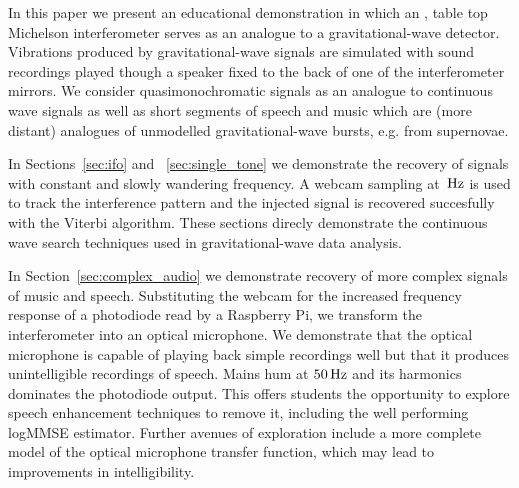 \documentclass[paper-main.tex]{subfiles}
\begin{document}

In this paper we present an educational demonstration in which an , table top Michelson interferometer serves as an analogue to a gravitational-wave detector. 
Vibrations produced by gravitational-wave signals are simulated with sound recordings played though a speaker fixed to the back of one of the interferometer mirrors. 
We consider quasimonochromatic signals as an analogue to continuous wave signals as well as short segments of speech and music which are (more distant) analogues of unmodelled gravitational-wave bursts, e.g. from supernovae. 


In Sections~\ref{sec:ifo} and ~\ref{sec:single_tone} we demonstrate the recovery of signals with constant and slowly wandering frequency. 
A webcam sampling at $\,{\rm Hz}$ is used to track the interference pattern and the injected signal is recovered succesfully with the Viterbi algorithm. 
These sections direcly demonstrate the continuous wave search techniques used in gravitational-wave data analysis. 


In Section~\ref{sec:complex_audio} we demonstrate recovery of more complex signals of music and speech. 
Substituting the webcam for the increased frequency response of a photodiode read by a Raspberry Pi, we transform the interferometer into an optical microphone.
We demonstrate that the optical microphone is capable of playing back simple recordings well but that it produces unintelligible recordings of speech. 
Mains hum at $50\,{\rm Hz}$ and its harmonics dominates the photodiode output. 
This offers students the opportunity to explore speech enhancement techniques to remove it, including the well performing logMMSE estimator. 
Further avenues of exploration include a more complete model of the optical microphone transfer function, which may lead to improvements in intelligibility. 
\end{document}
